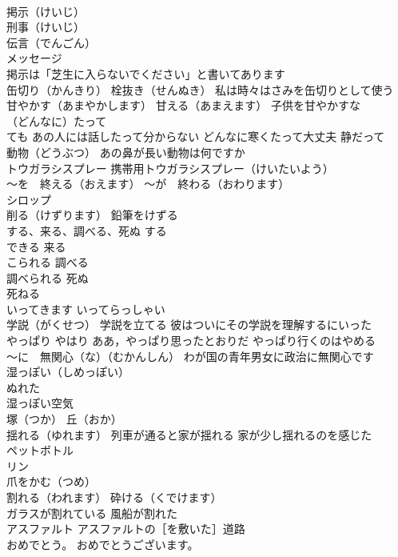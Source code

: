 \documentclass[8pt]{extreport}
\begin{document}
\begin{CJK}{UTF8}{min}
\\	掲示（けいじ）
\\	刑事（けいじ）
\\	伝言（でんごん）
\\	メッセージ 
\\	掲示は「芝生に入らないでください」と書いてあります
\\	缶切り（かんきり） 栓抜き（せんぬき） 私は時々はさみを缶切りとして使う
\\	甘やかす（あまやかします） 甘える（あまえます） 子供を甘やかすな
\\	（どんなに）たって 
\\	ても あの人には話したって分からない どんなに寒くたって大丈夫 静だって
\\	動物（どうぶつ） あの鼻が長い動物は何ですか
\\	トウガラシスプレー 携帯用トウガラシスプレー（けいたいよう）
\\	～を　終える（おえます） ～が　終わる（おわります）
\\	シロップ
\\	削る（けずります） 鉛筆をけずる
\\	する、来る、調べる、死ぬ	する 
\\	できる 来る 
\\	こられる 調べる 
\\	調べられる 死ぬ 
\\	死ねる
\\	いってきます いってらっしゃい
\\	学説（がくせつ） 学説を立てる 彼はついにその学説を理解するにいった
\\	やっぱり やはり ああ，やっぱり思ったとおりだ やっぱり行くのはやめる
\\	～に　無関心（な）（むかんしん） わが国の青年男女に政治に無関心です
\\	湿っぽい（しめっぽい）
\\	ぬれた 
\\	湿っぽい空気
\\	塚（つか） 丘（おか）
\\	揺れる（ゆれます） 列車が通ると家が揺れる 家が少し揺れるのを感じた
\\	ペットボトル
\\	リン
\\	爪をかむ（つめ）
\\	割れる（われます） 砕ける（くでけます）
\\	ガラスが割れている 風船が割れた
\\	アスファルト アスファルトの［を敷いた］道路
\\	おめでとう。 おめでとうございます。

\end{CJK}
\end{document}
